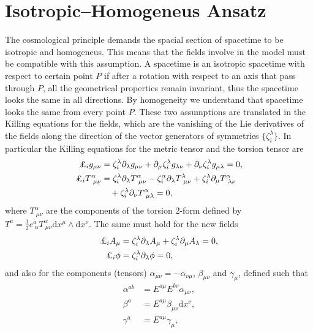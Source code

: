 \documentclass[aps,prd,12pt,superscriptaddress,showpacs,showkeys,longbibliography,reprint]{revtex4-1}
\begin{document}

\section{Isotropic--Homogeneus Ansatz}\label{homotropic}
The cosmological principle demands the spacial section of spacetime to be isotropic and homogeneus. This means that the fields involve in the model must be compatible with this assumption. A spacetime is an isotropic spacetime with respect to certain point $P$ if after a rotation with respect to an axis that pass through $P$, all the geometrical properties remain invariant, thus the spacetime looks the same in all directions. By homogeneity we understand that spacetime looks the same from every point $P$. These two assumptions are translated in the Killing equations for the fields, which are the vanishing of the Lie derivatives of the fields along the direction of the vector generators of symmetries $\{\zeta^\lambda_{i}\}$. In particular the Killing equations for the metric tensor and the torsion tensor are
\begin{align}
  \label{killing metric}
  \text{\textsterling}_i g_{\mu\nu}&=\zeta^\lambda_i\partial_\lambda g_{\mu\nu}+\partial_\mu\zeta^\lambda_i g_{\lambda\nu}+\partial_\nu\zeta^\lambda_i g_{\mu\lambda}=0,\\
  \text{\textsterling}_i T^\alpha_{\ \mu\nu}&=\zeta^\lambda_i\partial_\lambda T^\alpha_{\ \mu\nu}-\zeta^\alpha_i\partial_\lambda T^\lambda_{\ \mu\nu}
  +\zeta^\lambda_i\partial_\mu T^\alpha_{\ \lambda\nu}\notag\\
  &\quad +\zeta^\lambda_i\partial_\nu T^\alpha_{\ \mu\lambda}=0,
\end{align}
where $T^\alpha_{\ \mu\nu}$ are the components of the torsion 2-form defined by $T^a=\frac{1}{2}e^a_{\ \alpha}T^\alpha_{\ \mu\nu}\mbox{d}x^\mu\wedge\mbox{d}x^\nu$. The same must hold for the new fields
\begin{align}
  \label{killing vector}
  \text{\textsterling}_i A_\mu&=\zeta^\lambda_i\partial_\lambda A_\mu+\zeta^\lambda_i\partial_\mu A_\lambda=0,\\
  \text{\textsterling}_i \phi &=\zeta^\lambda_i\partial_\lambda\phi=0,
\end{align}
and also for the components (tensors) $\alpha_{\mu\nu}=-\alpha_{\nu\mu}$, $\beta_{\mu\nu}$ and $\gamma_\mu$, defined such that
\begin{align*}
  \alpha^{ab}&=E^{a\mu}E^{b\nu}\alpha_{\mu\nu},\\
  \beta^a&=E^{a\mu}\beta_{\mu\nu}\mbox{d}x^\nu,\\
  \gamma^a&=E^{a\mu}\gamma_\mu,
\end{align*} 
\end{document}
